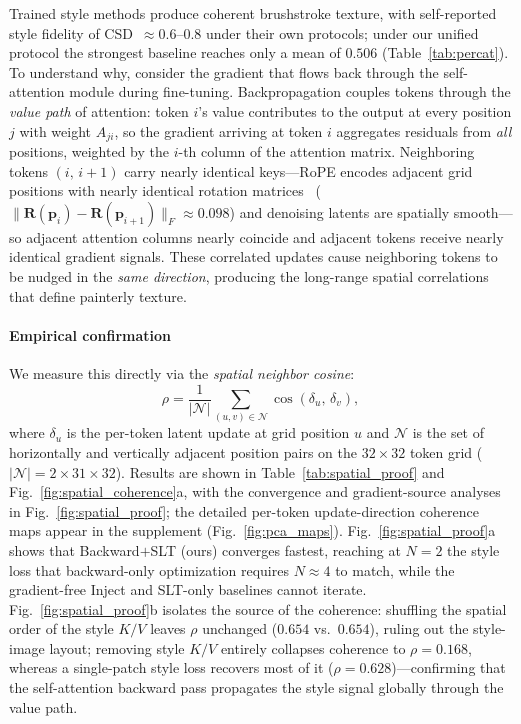 Trained style methods produce coherent brushstroke texture, with
self-reported style fidelity of CSD~$\approx 0.6$--$0.8$ under their own
protocols; under our unified protocol the strongest baseline reaches only a
mean of $0.506$ (Table~\ref{tab:percat}).
To understand why, consider the gradient that flows back through the
self-attention module during fine-tuning.
Backpropagation couples tokens through the \emph{value path} of attention:
token $i$'s value contributes to the output at every position $j$ with
weight $A_{ji}$, so the gradient arriving at token $i$ aggregates residuals
from \emph{all} positions, weighted by the $i$-th column of the attention
matrix.
Neighboring tokens $(i,\,i{+}1)$ carry nearly identical keys—RoPE encodes
adjacent grid positions with nearly identical rotation
matrices~\cite{su2024rope} ($\|\mathbf{R}(\mathbf{p}_i){-}\mathbf{R}(\mathbf{p}_{i+1})\|_F
\approx 0.098$) and denoising latents are spatially smooth—so adjacent
attention columns nearly coincide and adjacent tokens receive nearly
identical gradient signals.
These correlated updates cause neighboring tokens to be nudged in the
\emph{same direction}, producing the long-range spatial correlations that
define painterly texture.

\paragraph{Empirical confirmation}
We measure this directly via the \emph{spatial neighbor cosine}:
\begin{equation}
  \rho = \frac{1}{|\mathcal{N}|} \sum_{(u,v) \in \mathcal{N}}
         \cos(\delta_{u},\, \delta_{v}),
  \label{eq:rho}
\end{equation}
where $\delta_{u}$ is the per-token latent update at grid position $u$ and
$\mathcal{N}$ is the set of horizontally and vertically adjacent position
pairs on the $32 \times 32$ token grid
($|\mathcal{N}| = 2 \times 31 \times 32$).
Results are shown in Table~\ref{tab:spatial_proof} and
Fig.~\ref{fig:spatial_coherence}a, with the convergence and gradient-source
analyses in Fig.~\ref{fig:spatial_proof}; the detailed per-token
update-direction coherence maps appear in the supplement
(Fig.~\ref{fig:pca_maps}).
Fig.~\ref{fig:spatial_proof}a shows that Backward$+$SLT (ours) converges
fastest, reaching at $N{=}2$ the style loss that backward-only optimization
requires $N{\approx}4$ to match, while the gradient-free Inject and SLT-only
baselines cannot iterate.
Fig.~\ref{fig:spatial_proof}b isolates the source of the coherence: shuffling
the spatial order of the style $K/V$ leaves $\rho$ unchanged ($0.654$ vs.\
$0.654$), ruling out the style-image layout; removing style $K/V$ entirely
collapses coherence to $\rho{=}0.168$, whereas a single-patch style loss
recovers most of it ($\rho{=}0.628$)---confirming that the self-attention
backward pass propagates the style signal globally through the value path.


